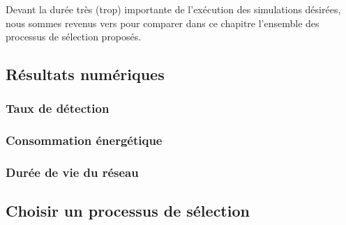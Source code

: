 Devant la durée très (trop) importante de l'exécution des simulations désirées, nous sommes revenus vers \nsii pour comparer dans ce chapitre l'ensemble des processus de sélection proposés.

    \subsection{Résultats numériques}

        \subsubsection{Taux de détection}

        \subsubsection{Consommation énergétique}

        \subsubsection{Durée de vie du réseau}

    \subsection{Choisir un processus de sélection}
